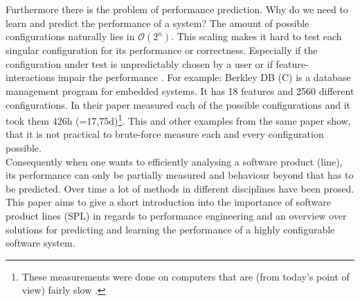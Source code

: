 Furthermore there is the problem of performance prediction. Why do we need to learn and predict the performance of a system?
The amount of possible configurations naturally lies in $\mathcal{O}(2^n)$. This scaling makes it hard to test each singular configuration for its performance or correctness. Especially if the configuration under test is unpredictably chosen by a user \cite{PredictingPerformanceAutmatedFeatureDetectionSiegmund2012} or if feature-interactions impair the performance \cite{VariabilityAwarePerformancePredictionJianmeiSigmundApel}. For example:
Berkley DB (C) is a database management program for embedded systems. It has 18 features and 2560 different configurations. In their paper  \citet{AutomatedFeatureDetectionSiegmund2012} measured each of the possible configurations and it took them 426h (=17,75d)\footnote{These measurements were done on computers that are (from today's point of view) fairly slow \cite{AutomatedFeatureDetectionSiegmund2012,CPUDatabase}.}. This and other examples from the same paper show, that it is not practical to brute-force measure each and every configuration possible. \\ 
Consequently when one wants to efficiently analysing a software product (line), its performance can only be partially measured and behaviour beyond that has to be predicted. Over time a lot of methods in different disciplines have been prosed.\\
This paper aims to give a short introduction into the importance of software product lines (SPL) in regards to performance engineering and an overview over solutions for predicting and learning the performance of a highly configurable software system.
